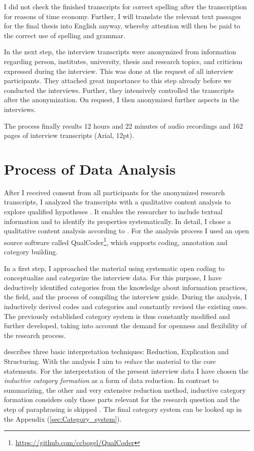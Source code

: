 \documentclass[12pt,a4paper,titlepage,oneside,abstract=true,toc=listof,toc=bibliography]{scrreprt}
\begin{document}
I did not check the finished transcripts for correct spelling after the transcription for reasons of time economy. Further, I will translate the relevant text passages for the final thesis into English anyway, whereby attention will then be paid to the correct use of spelling and grammar.

In the next step, the interview transcripts were anonymized from information regarding person, institutes, university, thesis and research topics, and criticism expressed during the interview. This was done at the request of all interview participants. They attached great importance to this step already before we conducted the interviews. Further, they intensively controlled the transcripts after the anonymization. On request, I then anonymized further aspects in the interviews.

The process finally results 12 hours and 22 minutes of audio recordings and 162 pages of interview transcripts (Arial, 12pt). 

\section{Process of Data Analysis}
After I received consent from all participants for the anonymized research transcripts, I analyzed the transcripts with a qualitative content analysis to explore qualified hypotheses \citep{Kohlbacher2006, Krippendorff2012, Mayring2000, Mayring2014}. It enables the researcher to include textual information and to identify its properties systematically. In detail, I chose a qualitative content analysis according to \citep{Mayring2014}. For the analysis process I used an open source software called QualCoder\footnote{\url{https://github.com/ccbogel/QualCoder}}, which supports coding, annotation and category building. 

In a first step, I approached the material using systematic open coding \citep{Corbin1990} to conceptualize and categorize the interview data. For this purpose, I have deductively identified categories from the knowledge about information practices, the field, and the process of compiling the interview guide. During the analysis, I inductively derived codes and categories and constantly revised the existing ones. The previously established category system is thus constantly modified and further developed, taking into account the demand for openness and flexibility of the research process. 

\citet[p. 65]{Mayring2014} describes three basic interpretation techniques: Reduction, Explication and Structuring. With the analysis I aim to \textit{reduce} the material to the core statements. For the interpretation of the present interview data I have chosen the \textit{inductive category formation} as a form of data reduction. In contrast to summarizing, the other and very extensive reduction method, inductive category formation considers only those parts relevant for the research question and the step of paraphrasing is skipped \cite[p. 79]{Mayring2014}. The final category system can be looked up in the Appendix (\ref{sec:Category_system}).
	
\end{document}
